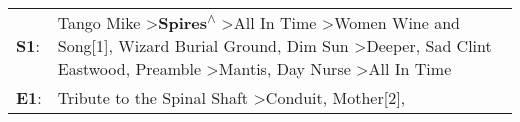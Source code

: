 \begin{supertabular}{p{0.03\textwidth}p{0.92\textwidth}}
 \textbf{S1}:  &  Tango Mike\textsuperscript{} \textgreater \enspace \textbf{Spires\textsuperscript{$\wedge$}} \textgreater \enspace All In Time\textsuperscript{} \textgreater \enspace Women Wine and Song[1]\textsuperscript{}, \enspace Wizard Burial Ground\textsuperscript{}, \enspace Dim Sun\textsuperscript{} \textgreater \enspace Deeper\textsuperscript{}, \enspace Sad Clint Eastwood\textsuperscript{}, \enspace Preamble\textsuperscript{} \textgreater \enspace Mantis\textsuperscript{}, \enspace Day Nurse\textsuperscript{} \textgreater \enspace All In Time\textsuperscript{}  \enspace  \\
 \textbf{E1}:  &                                                                                                                                                                                                                                                                                                                                                                                                              Tribute to the Spinal Shaft\textsuperscript{} \textgreater \enspace Conduit\textsuperscript{}, \enspace Mother[2]\textsuperscript{}, \textsuperscript{}  \enspace  \\
\end{supertabular}
